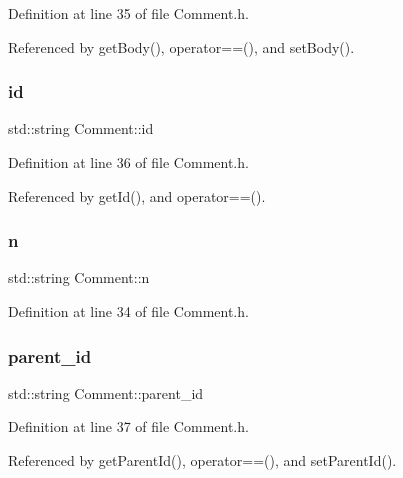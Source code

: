 Definition at line 35 of file Comment.\+h.



Referenced by get\+Body(), operator==(), and set\+Body().

\mbox{\label{class_comment_a63db6067036146247c4ab7f663d90369}} 
\subsubsection{\texorpdfstring{id}{id}}
{\footnotesize\ttfamily std\+::string Comment\+::id\hspace{0.3cm}{\ttfamily [private]}}



Definition at line 36 of file Comment.\+h.



Referenced by get\+Id(), and operator==().

\mbox{\label{class_comment_a28bb2d16cad342d68d84b184c4ce07ba}} 
\subsubsection{\texorpdfstring{n}{n}}
{\footnotesize\ttfamily std\+::string Comment\+::n\hspace{0.3cm}{\ttfamily [private]}}



Definition at line 34 of file Comment.\+h.

\mbox{\label{class_comment_abc88c0f64df05cb3d29ad1c7aa1621c5}} 
\subsubsection{\texorpdfstring{parent\+\_\+id}{parent\_id}}
{\footnotesize\ttfamily std\+::string Comment\+::parent\+\_\+id\hspace{0.3cm}{\ttfamily [private]}}



Definition at line 37 of file Comment.\+h.



Referenced by get\+Parent\+Id(), operator==(), and set\+Parent\+Id().

